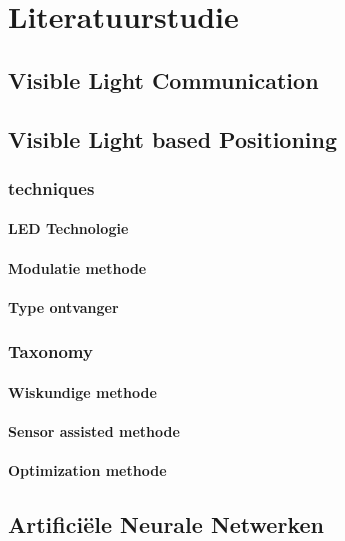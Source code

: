 \chapter{Literatuurstudie}
\section{Visible Light Communication}
\section{Visible Light based Positioning}
	\subsection{techniques}
		\subsubsection{LED Technologie}
		\subsubsection{Modulatie methode}
		\subsubsection{Type ontvanger}
	\subsection{Taxonomy}
		\subsubsection{Wiskundige methode}
		\subsubsection{Sensor assisted methode}
		\subsubsection{Optimization methode}
\section{Artificiële Neurale Netwerken}

